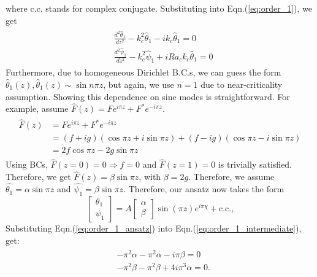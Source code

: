 \documentclass{article}
\begin{document}
where c.c. stands for complex conjugate. 
Substituting into Eqn.(\ref{eq:order_1}), we get
\begin{align}\label{eq:order_1_intermediate}
 \begin{split}
  & \frac{d^{2}\hat{\theta}_{1}}{dz^{2}} - k_{c}^{2}\hat{\theta}_{1} - i k_{c}\hat{\theta}_{1} = 0\\
  & \frac{d^{2}\hat{\psi}_{1}}{dz^{2}} - k_{c}^{2}\hat{\psi}_{1} + i Ra_{c} k_{c}\hat{\theta}_{1} = 0
 \end{split}
\end{align}
%
Furthermore, due to homogeneous Dirichlet B.C.s, we can guess the form $\hat{\theta}_{1}(z), \hat{\theta}_{1}(z) \sim \sin{n\pi z} $, but again, we use $n=1$ due to near-criticality assumption. Showing this dependence on sine modes is straightforward. For example, assume $\hat{F}(z) = F e^{i\pi z} + F^{*} e^{-i \pi z}$. 
\begin{align}
 \begin{split}
  \hat{F}(z) &= F e^{i\pi z} + F^{*} e^{-i \pi z} \\
  &= (f+ig)(\cos{\pi z} + i \sin{\pi z}) + (f-ig)(\cos{\pi z} - i \sin{\pi z})\\
  &= 2f \cos{\pi z} - 2g \sin{\pi z}
 \end{split}
\end{align}
%
Using BCs, $\hat{F}(z=0) = 0 \Rightarrow f = 0$ and $\hat{F}(z=1) = 0$ is trivially satisfied. Therefore, we get $\hat{F}(z) = \beta \sin{\pi z}$, with $\beta = 2g$.
%
Therefore, we assume $\hat{\theta_{1}} = \alpha \sin{\pi z}$ and $\hat{\psi_{1}} = \beta \sin{\pi z}$. Therefore, our ansatz now takes the form
\begin{equation}\label{eq:order_1_ansatz}
 \begin{bmatrix}
  \theta_{1} \\
 \psi_{1}
 \end{bmatrix} =
 A
 \begin{bmatrix}
  \alpha \\
 \beta
 \end{bmatrix}
 \sin{(\pi z)} e^{i\pi \chi} + \textrm{c.c.,}
\end{equation}
%
Substituting Eqn.(\ref{eq:order_1_ansatz}) into Eqn.(\ref{eq:order_1_intermediate}), get:
\begin{align}
 \begin{split}
  & -\pi^{2} \alpha - \pi^{2} \alpha - i \pi \beta = 0 \\
  & -\pi^{2} \beta - \pi^{2} \beta + 4 i \pi^{3} \alpha = 0. 
 \end{split}
\end{align}
\end{document}

